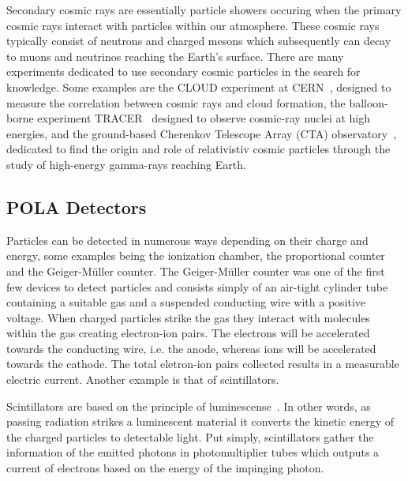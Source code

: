 \documentclass[12pt,a4paper]{amsart}
\begin{document}
Secondary cosmic rays are essentially particle showers occuring when the primary cosmic rays interact with particles within our atmosphere. These cosmic rays typically consist of neutrons and charged mesons which subsequently can decay to muons and neutrinos reaching the Earth's surface. There are many experiments dedicated to use secondary cosmic particles in the search for knowledge. Some examples are the CLOUD experiment at CERN~\cite{cloud2000}, designed to measure the correlation between cosmic rays and cloud formation, the balloon-borne experiment TRACER~\cite{tracer2007} designed to observe cosmic-ray nuclei at high energies, and the ground-based Cherenkov Telescope Array (CTA) observatory~\cite{cta2011}, dedicated to find the origin and role of relativistiv cosmic particles through the study of high-energy gamma-rays reaching Earth.

\setcounter{section}{2}
\setcounter{subsection}{0}
\subsection{POLA Detectors}
Particles can be detected in numerous ways depending on their charge and energy, some examples being the ionization chamber, the proportional counter and the Geiger-Müller counter. The Geiger-Müller counter was one of the first few devices to detect particles and consists simply of an air-tight cylinder tube containing a suitable gas and a suspended conducting wire with a positive voltage. When charged particles strike the gas they interact with molecules within the gas creating electron-ion pairs. The electrons will be accelerated towards the conducting wire, i.e. the anode, whereas ions will be accelerated towards the cathode. The total eletron-ion pairs collected results in a measurable electric current. Another example is that of scintillators.

Scintillators are based on the principle of luminescense~\cite{knoll2000}. In other words, as passing radiation strikes a luminescent material it converts the kinetic energy of the charged particles to detectable light. Put simply, scintillators gather the information of the emitted photons in photomultiplier tubes which outputs a current of electrons based on the energy of the impinging photon.

\end{document}
